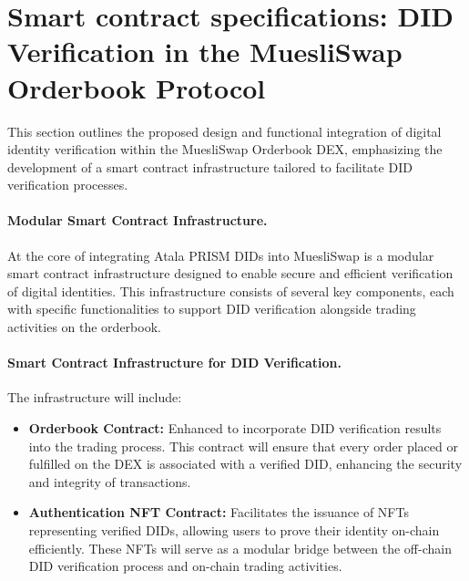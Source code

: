 \documentclass[11pt]{article}
\begin{document}
\newpage


\section{Smart contract specifications: DID Verification in the MuesliSwap Orderbook Protocol}

This section outlines the proposed design and functional integration of digital identity verification within the MuesliSwap Orderbook DEX, emphasizing the development of a smart contract infrastructure tailored to facilitate DID verification processes.

\paragraph{Modular Smart Contract Infrastructure.} At the core of integrating Atala PRISM DIDs into MuesliSwap is a modular smart contract infrastructure designed to enable secure and efficient verification of digital identities. This infrastructure consists of several key components, each with specific functionalities to support DID verification alongside trading activities on the orderbook.

\paragraph{Smart Contract Infrastructure for DID Verification.} The infrastructure will include:
\begin{itemize}
\item \textbf{Orderbook Contract:} Enhanced to incorporate DID verification results into the trading process. This contract will ensure that every order placed or fulfilled on the DEX is associated with a verified DID, enhancing the security and integrity of transactions.
\item \textbf{Authentication NFT Contract:} Facilitates the issuance of NFTs representing verified DIDs, allowing users to prove their identity on-chain efficiently. These NFTs will serve as a modular bridge between the off-chain DID verification process and on-chain trading activities.
\end{itemize}
\end{document}
